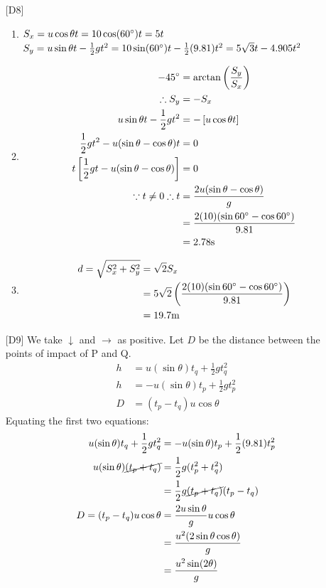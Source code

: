 \documentclass[11pt]{article}
\begin{document}
\begin{enumerate}
		\item [{[D8]}]
		\begin{enumerate}[label=(\roman*)]
			\item $S_x = u\cos\theta t = 10\cos(60\degree) t = 5t$ \\ 
			$S_y = u\sin\theta t - \frac{1}{2}gt^2 = 10\sin(60\degree) t - \frac{1}{2}(9.81)t^2 = 5\sqrt{3}t - 4.905t^2$
			\item
			\begin{align*}
				-45\degree &= \arctan\left(\frac{S_y}{S_x}\right) \\
				\therefore S_y &= -S_x \\
				u\sin\theta t - \frac{1}{2}gt^2 &= -\left[u\cos\theta t\right] \\
				\frac{1}{2}gt^2 - u(\sin\theta-\cos\theta)t&= 0 \\
				t\left[\frac{1}{2}gt-u(\sin\theta-\cos\theta)\right] &= 0 \\
				\because t \neq 0 \therefore t &= \frac{2u(\sin\theta-\cos\theta)}{g}\\	
				&= \frac{2(10)(\sin60\degree -\cos60\degree)}{9.81} \\
				&= 2.78\text{s}
			\end{align*}
			\item 
			\begin{align*}
			d = \sqrt{S_x^2 + S_y^2} &= \sqrt{2}S_x \\
			&= 5\sqrt{2}\left(\frac{2(10)(\sin60\degree -\cos60\degree)}{9.81}\right) \\
			&=19.7 \text{m}
			\end{align*}
		\end{enumerate}
		
		\item [{[D9]}] We take $\downarrow$ and $\rightarrow$ as positive. Let $D$ be the distance between the points of impact of P and Q.
		\begin{align*}
			h &= u(\sin\theta)t_q + \frac{1}{2}gt_q^2 \\
			h &= -u(\sin\theta)t_p + \frac{1}{2}gt_p^2 \\
			D &= (t_p-t_q)u\cos\theta 
		\end{align*}
		Equating the first two equations:
		\begin{align*}
			u(\sin\theta)t_q + \frac{1}{2}gt_q^2 &= -u(\sin\theta)t_p + \frac{1}{2}(9.81)t_p^2 \\
			u(\sin\theta)\cancel{(t_p+t_q)} &= \frac{1}{2}g(t_p^2+t_q^2) \\
			&=\frac{1}{2}g\cancel{(t_p+t_q)}(t_p-t_q) \\
			D=(t_p-t_q)u\cos\theta  &= \frac{2u\sin\theta}{g}u\cos\theta \\
			&= \frac{u^2(2\sin\theta\cos\theta)}{g} \\
			&= \frac{u^2\sin(2\theta)}{g}
		\end{align*}
	\end{enumerate}
	
\end{document}
